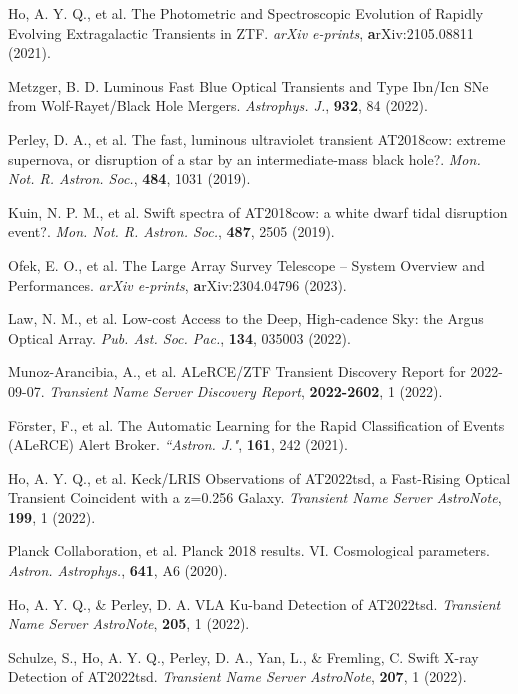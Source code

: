 \documentclass{nature_plusfigure}
\newcommand{\mn}{{Mon. Not. R. Astron. Soc.}}
\newcommand{\mnras}{\mn}
\newcommand{\aj}{{``Astron. J."}}
\newcommand{\apj}{{Astrophys. J.}}
\newcommand{\aap}{{Astron. Astrophys.}}
\newcommand{\pasp}{{Pub. Ast. Soc. Pac.}}
\begin{document}
\begin{thebibliography}{100}
 Ho, A. Y. Q., et al. The Photometric and Spectroscopic Evolution of Rapidly Evolving Extragalactic Transients in ZTF. \emph{arXiv e-prints}, \textbf arXiv:2105.08811 (2021). 

  Metzger, B. D. Luminous Fast Blue Optical Transients and Type Ibn/Icn SNe from Wolf-Rayet/Black Hole Mergers. \emph{\apj}, \textbf{932}, 84 (2022). 

  Perley, D. A., et al. The fast, luminous ultraviolet transient AT2018cow: extreme supernova, or disruption of a star by an intermediate-mass black hole?. \emph{\mnras}, \textbf{484}, 1031 (2019). 

  Kuin, N. P. M., et al. Swift spectra of AT2018cow: a white dwarf tidal disruption event?. \emph{\mnras}, \textbf{487}, 2505 (2019). 

 Ofek, E. O., et al. The Large Array Survey Telescope -- System Overview and Performances. \emph{arXiv e-prints}, \textbf arXiv:2304.04796 (2023). 

 Law, N. M., et al. Low-cost Access to the Deep, High-cadence Sky: the Argus Optical Array. \emph{\pasp}, \textbf{134}, 035003 (2022). 


 Munoz-Arancibia, A., et al. ALeRCE/ZTF Transient Discovery Report for 2022-09-07. \emph{Transient Name Server Discovery Report}, \textbf{2022-2602}, 1 (2022). 

 Förster, F., et al. The Automatic Learning for the Rapid Classification of Events (ALeRCE) Alert Broker. \emph{\aj}, \textbf{161}, 242 (2021). 

 Ho, A. Y. Q., et al. Keck/LRIS Observations of AT2022tsd, a Fast-Rising Optical Transient Coincident with a z=0.256 Galaxy. \emph{Transient Name Server AstroNote}, \textbf{199}, 1 (2022). 

 Planck Collaboration, et al. Planck 2018 results. VI. Cosmological parameters. \emph{\aap}, \textbf{641}, A6 (2020). 

 Ho, A. Y. Q., \& Perley, D. A. VLA Ku-band Detection of AT2022tsd. \emph{Transient Name Server AstroNote}, \textbf{205}, 1 (2022). 

 Schulze, S., Ho, A. Y. Q., Perley, D. A., Yan, L., \& Fremling, C. Swift X-ray Detection of AT2022tsd. \emph{Transient Name Server AstroNote}, \textbf{207}, 1 (2022). 


\end{thebibliography}
\end{document}
